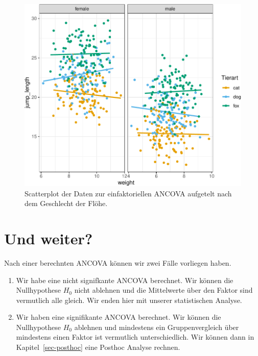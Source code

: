 \documentclass[
  letterpaper,
]{scrbook}
\providecommand{\tightlist}{%
  \setlength{\itemsep}{0pt}\setlength{\parskip}{0pt}}\usepackage{longtable,booktabs,array}
\begin{document}
\begin{figure}[H]

{\centering \includegraphics{./stat-tests-ancova_files/figure-pdf/fig-stat-ancova-02-1.pdf}

}

\caption{\label{fig-stat-ancova-02}Scatterplot der Daten zur
einfaktoriellen ANCOVA aufgetelt nach dem Geschlecht der Flöhe.}

\end{figure}

\hypertarget{und-weiter-1}{%
\section{Und weiter?}\label{und-weiter-1}}

Nach einer berechnten ANCOVA können wir zwei Fälle vorliegen haben.

{}

\begin{enumerate}
\def\labelenumi{\arabic{enumi})}
\tightlist
\item
  Wir habe eine nicht signifkante ANCOVA berechnet. Wir können die
  Nullhypothese \(H_0\) nicht ablehnen und die Mittelwerte über den
  Faktor sind vermutlich alle gleich. Wir enden hier mit unserer
  statistischen Analyse.
\item
  Wir haben eine signifikante ANCOVA berechnet. Wir können die
  Nullhypothese \(H_0\) ablehnen und mindestens ein Gruppenvergleich
  über mindestens einen Faktor ist vermutlich unterschiedlich. Wir
  können dann in Kapitel~\ref{sec-posthoc} eine Posthoc Analyse rechnen.
\end{enumerate}
\end{document}
